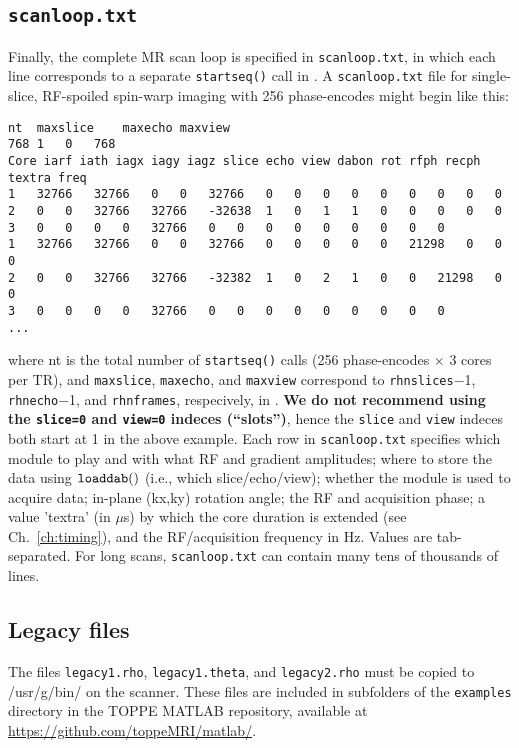 \subsection{\tt scanloop.txt}
Finally, the complete MR scan loop is specified in {\tt scanloop.txt}, in which each line corresponds to a separate {\tt startseq()} call in \toppe.
A {\tt scanloop.txt} file for single-slice, RF-spoiled spin-warp imaging with 256 phase-encodes might begin like this:
\begin{lstlisting}
nt	maxslice	maxecho	maxview
768	1	0	768	
Core iarf iath iagx iagy iagz slice echo view dabon rot rfph recph textra freq
1	32766	32766	0	0	32766	0	0	0	0	0	0	0	0	0
2	0	0	32766	32766	-32638	1	0	1	1	0	0	0	0	0
3	0	0	0	0	32766	0	0	0	0	0	0	0	0	0
1	32766	32766	0	0	32766	0	0	0	0	0	21298	0	0	0
2	0	0	32766	32766	-32382	1	0	2	1	0	0	21298	0	0
3	0	0	0	0	32766	0	0	0	0	0	0	0	0	0
...
\end{lstlisting}
where nt is the total number of {\tt startseq()} calls (256 phase-encodes $\times$ 3 cores per TR), and \texttt{maxslice}, \texttt{maxecho}, and \texttt{maxview} correspond to \texttt{rhnslices}$-$1, \texttt{rhnecho}$-$1, and \texttt{rhnframes}, respecively, in \toppe.
\textbf{We do not recommend using the {\tt slice=0} and {\tt view=0} indeces (``slots'')}, hence the {\tt slice} and {\tt view} indeces both start at 1 in the above example.
Each row in {\tt scanloop.txt} specifies which module to play and with what RF and gradient amplitudes; where to store the data using $\tt loaddab()$ (i.e., which slice/echo/view); whether the module is used to acquire data; in-plane (kx,ky) rotation angle; the RF and acquisition phase; a value 'textra' (in $\mu$s) by which the core duration is extended (see Ch.~\ref{ch:timing}), and the RF/acquisition frequency in Hz.
Values are tab-separated.
For long scans, {\tt scanloop.txt} can contain many tens of thousands of lines.


\subsection{Legacy files }

The files {\tt legacy1.rho}, {\tt legacy1.theta}, and {\tt legacy2.rho} must be copied to /usr/g/bin/ on the scanner.
These files are included in subfolders of the {\tt examples} directory in the TOPPE MATLAB repository, available at \url{https://github.com/toppeMRI/matlab/}.

